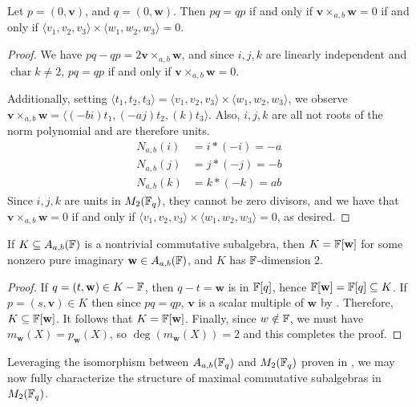 \documentclass{amsart}
\begin{document}
\begin{lemma}\label{anticommutativity}
    Let $p = (0, \mathbf{v})$, and $q = (0, \mathbf{w})$. Then $pq = qp$ if and only if $\mathbf{v} \times_{a,b} \mathbf{w} = 0$ if and only if $\langle v_1, v_2, v_3 \rangle \times \langle w_1, w_2, w_3 \rangle = 0$.
\end{lemma}
\begin{proof}
    We have $pq - qp = 2 \mathbf{v} \times_{a,b} \mathbf{w}$, and since $i, j, k$ are linearly independent and $\operatorname{char} k \neq 2$, $pq = qp$ if and only if $\mathbf{v} \times_{a,b} \mathbf{w} = 0$.

    Additionally, setting $\langle t_1, t_2, t_3 \rangle = \langle v_1, v_2, v_3 \rangle \times \langle w_1, w_2, w_3 \rangle$, we observe $\mathbf{v} \times_{a,b} \mathbf{w} = \langle (-bi)t_1, (-aj) t_2, (k) t_3 \rangle$. Also, $i, j, k$ are all not roots of the norm polynomial and are therefore units. 
    \begin{align*}
        N_{a,b}(i) &= i * (-i) = -a \\
        N_{a,b}(j) &= j * (-j) = -b \\
        N_{a,b}(k) &= k * (-k) = ab
    \end{align*}
    Since $i, j, k$ are units in $M_2(\protect\mathbb{F}_q)$, they cannot be zero divisors, and we have that $\mathbf{v} \times_{a,b} \mathbf{w} = 0$ if and only if $\langle v_1, v_2, v_3 \rangle \times \langle w_1, w_2, w_3 \rangle = 0$, as desired. 
\end{proof}

\begin{theorem}\label{commutative-planes}
    If $K \subseteq A_{a,b}(\protect\mathbb{F})$ is a nontrivial commutative subalgebra, then $K = \protect\mathbb{F}[\mathbf{w}]$ for some nonzero pure imaginary $\mathbf{w} \in A_{a,b}(\protect\mathbb{F})$, and $K$ has $\protect\mathbb{F}$-dimension $2$.
\end{theorem}
\begin{proof}
    If $q = (t, \mathbf{w}) \in K - \protect\mathbb{F}$, then $q-t = \mathbf{w}$ is in $\protect\mathbb{F}[q]$, hence $\protect\mathbb{F}[\mathbf{w}] = \protect\mathbb{F}[q] \subseteq K$. If $p = (s, \mathbf{v}) \in K$ then since $pq = qp$, $\mathbf{v}$ is a scalar multiple of $\mathbf{w}$ by . Therefore, $K \subseteq \protect\mathbb{F}[\mathbf{w}]$. It follows that $K = \protect\mathbb{F}[\mathbf{w}]$. Finally, since $w \notin \protect\mathbb{F}$, we must have $m_{\mathbf{w}}(X) = p_{\mathbf{w}}(X)$, so $\deg(m_{\mathbf{w}}(X)) = 2$ and this completes the proof.
\end{proof}

Leveraging the isomorphism between $A_{a,b}(\protect\mathbb{F}_q)$ and $M_2(\protect\mathbb{F}_q)$ proven in , we may now fully characterize the structure of maximal commutative subalgebras in $M_2(\protect\mathbb{F}_q)$.
\end{document}
